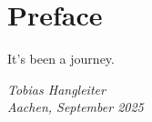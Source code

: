 \chapter*{Preface}

It's been a journey.

\begin{flushright}
    \itshape
    Tobias Hangleiter\\
    Aachen, September 2025
\end{flushright}
